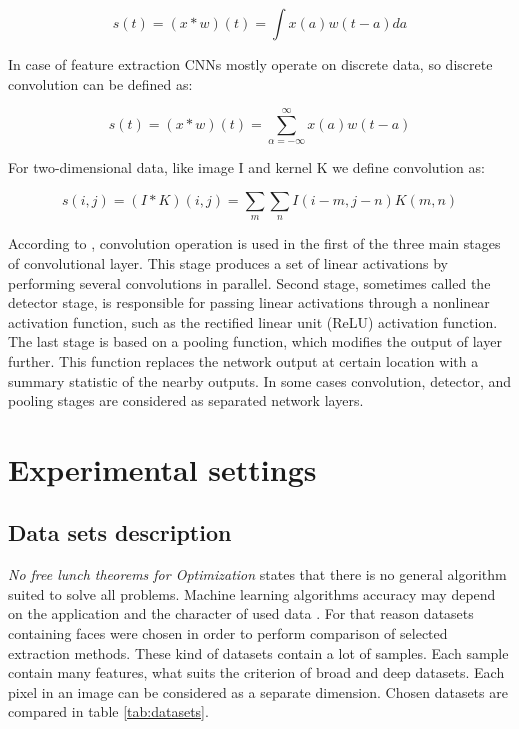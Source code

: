 \documentclass[a4paper, 10 pt, journal]{ieeeconf}
\begin{document}
\begin{equation}
    s(t) = (x*w)(t) = \int x(a)w(t-a)da
\end{equation}

In case of feature extraction CNNs mostly operate on discrete data, so discrete convolution can be defined as:

\begin{equation}
    s(t) = (x*w)(t) = \sum_{\alpha=-\infty}^{\infty} x(a)w(t-a)
\end{equation}

For two-dimensional data, like image I and kernel K we define convolution as:

\begin{equation}
    s(i, j) = (I*K)(i, j) = \sum_m \sum_n I(i-m, j-n)K(m, n)
\end{equation}

According to \cite{Goodfellow-et-al-2016}, convolution operation is used in the first of  the three main stages of convolutional layer. This stage produces a set of linear activations by performing several convolutions in parallel. Second stage, sometimes called the detector stage, is responsible for passing linear activations through a nonlinear activation function, such as the rectified linear unit (ReLU) activation function. The last stage is based on a pooling function, which modifies the output of layer further. This function replaces the network output at certain location with a summary statistic of the nearby outputs. In some cases convolution, detector, and pooling stages are considered as separated network layers.

\section{Experimental settings}

\subsection{Data sets description}

\textsl{No free lunch theorems for Optimization} \cite{no-free-lunch} states that there is no general algorithm suited to solve all problems. Machine learning algorithms accuracy may depend on the application and the character of used data \cite{alppaydin}. For that reason datasets containing faces were chosen in order to perform comparison of selected extraction methods. These kind of datasets contain a lot of samples. Each sample contain many features, what suits the criterion of broad and deep datasets. Each pixel in an image can be considered as a separate dimension. Chosen datasets are compared in table \ref{tab:datasets}.
\end{document}

